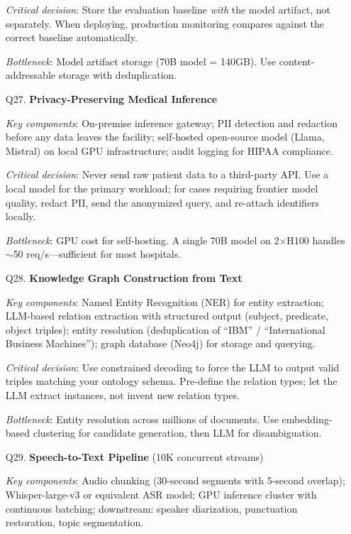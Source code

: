 \begin{enumerate}[leftmargin=*]
    \textit{Critical decision}: Store the evaluation baseline \emph{with} the model artifact, not separately. When deploying, production monitoring compares against the correct baseline automatically.

    \textit{Bottleneck}: Model artifact storage (70B model = 140GB). Use content-addressable storage with deduplication.

    \item[Q27.] \textbf{Privacy-Preserving Medical Inference}

    \textit{Key components}: On-premise inference gateway; PII detection and redaction before any data leaves the facility; self-hosted open-source model (Llama, Mistral) on local GPU infrastructure; audit logging for HIPAA compliance.

    \textit{Critical decision}: Never send raw patient data to a third-party API. Use a local model for the primary workload; for cases requiring frontier model quality, redact PII, send the anonymized query, and re-attach identifiers locally.

    \textit{Bottleneck}: GPU cost for self-hosting. A single 70B model on 2$\times$H100 handles $\sim$50 req/s---sufficient for most hospitals.

    \item[Q28.] \textbf{Knowledge Graph Construction from Text}

    \textit{Key components}: Named Entity Recognition (NER) for entity extraction; LLM-based relation extraction with structured output (subject, predicate, object triples); entity resolution (deduplication of ``IBM'' / ``International Business Machines''); graph database (Neo4j) for storage and querying.

    \textit{Critical decision}: Use constrained decoding to force the LLM to output valid triples matching your ontology schema. Pre-define the relation types; let the LLM extract instances, not invent new relation types.

    \textit{Bottleneck}: Entity resolution across millions of documents. Use embedding-based clustering for candidate generation, then LLM for disambiguation.

    \item[Q29.] \textbf{Speech-to-Text Pipeline} (10K concurrent streams)

    \textit{Key components}: Audio chunking (30-second segments with 5-second overlap); Whisper-large-v3 or equivalent ASR model; GPU inference cluster with continuous batching; downstream: speaker diarization, punctuation restoration, topic segmentation.


\end{enumerate}
